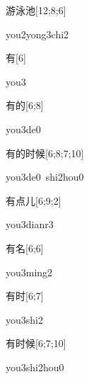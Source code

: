 \begin{verbete}{游泳池}[12;8;6]
\begin{pronuncia}{you2yong3chi2}
\end{pronuncia}
\end{verbete}

\begin{verbete}[you3]{有}[6]
\begin{pronuncia}{you3}
\end{pronuncia}
\end{verbete}

\begin{verbete}[you3de0]{有的}[6;8]
\begin{pronuncia}{you3de0}
\end{pronuncia}
\end{verbete}

\begin{verbete}{有的时候}[6;8;7;10]
\begin{pronuncia}[\\]{you3de0\ shi2hou0}
\end{pronuncia}
\end{verbete}

\begin{verbete}{有点儿}[6;9;2]
\begin{pronuncia}{you3dianr3}
\end{pronuncia}
\end{verbete}

\begin{verbete}{有名}[6;6]
\begin{pronuncia}{you3ming2}
\end{pronuncia}
\end{verbete}

\begin{verbete}{有时}[6;7]
\begin{pronuncia}{you3shi2}
\end{pronuncia}
\end{verbete}

\begin{verbete}{有时候}[6;7;10]
\begin{pronuncia}{you3shi2hou0}
\end{pronuncia}
\end{verbete}


